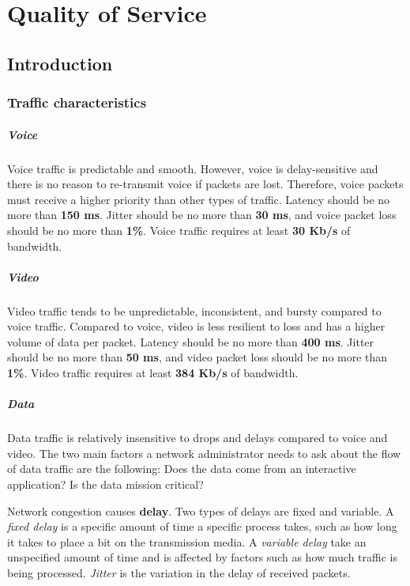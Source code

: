 \chapter{Quality of Service}

\section{Introduction}

\subsection{Traffic characteristics}

\paragraph{Voice}Voice traffic is predictable and smooth. However, voice is delay-sensitive and there is no reason to re-transmit voice if packets are lost. Therefore, voice packets must receive a higher priority than other types of traffic. Latency should be no more than \textbf{150 ms}. Jitter should be no more than \textbf{30 ms}, and voice packet loss should be no more than \textbf{1\%}. Voice traffic requires at least \textbf{30 Kb/s} of bandwidth.

\paragraph{Video}Video traffic tends to be unpredictable, inconsistent, and bursty compared to voice traffic. Compared to voice, video is less resilient to loss and has a higher volume of data per packet. Latency should be no more than \textbf{400 ms}. Jitter should be no more than \textbf{50 ms}, and video packet loss should be no more than \textbf{1\%}. Video traffic requires at least \textbf{384 Kb/s} of bandwidth.

\paragraph{Data}Data traffic is relatively insensitive to drops and delays compared to voice and video. The two main factors a network administrator needs to ask about the flow of data traffic are the following: Does the data come from an interactive application? Is the data mission critical?

Network congestion causes \textbf{delay}. Two types of delays are fixed and variable. A \emph{fixed delay} is a specific amount of time a specific process takes, such as how long it takes to place a bit on the transmission media. A \emph{variable delay} take an unspecified amount of time and is affected by factors such as how much traffic is being processed. \emph{Jitter} is the variation in the delay of received packets.

